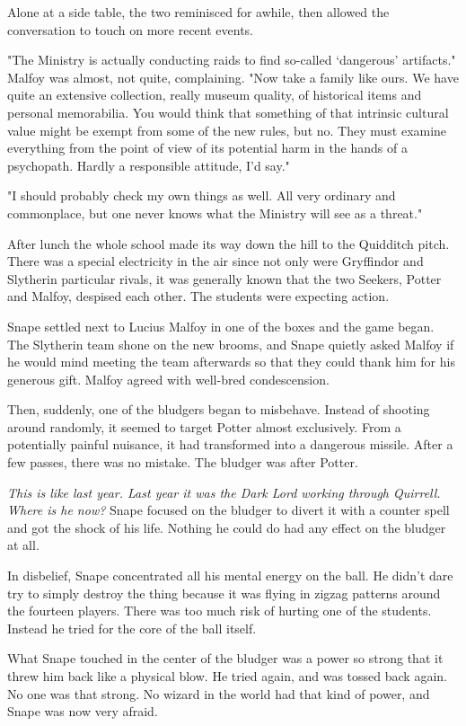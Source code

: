 \documentclass[a4paper,11pt]{article}
\begin{document}
Alone at a side table, the two reminisced for awhile, then allowed the conversation to touch on more recent events.

"The Ministry is actually conducting raids to find so-called `dangerous' artifacts." Malfoy was almost, not quite, complaining. "Now take a family like ours. We have quite an extensive collection, really museum quality, of historical items and personal memorabilia. You would think that something of that intrinsic cultural value might be exempt from some of the new rules, but no. They must examine everything from the point of view of its potential harm in the hands of a psychopath. Hardly a responsible attitude, I'd say."

"I should probably check my own things as well. All very ordinary and commonplace, but one never knows what the Ministry will see as a threat."

After lunch the whole school made its way down the hill to the Quidditch pitch. There was a special electricity in the air since not only were Gryffindor and Slytherin particular rivals, it was generally known that the two Seekers, Potter and Malfoy, despised each other. The students were expecting action.

Snape settled next to Lucius Malfoy in one of the boxes and the game began. The Slytherin team shone on the new brooms, and Snape quietly asked Malfoy if he would mind meeting the team afterwards so that they could thank him for his generous gift. Malfoy agreed with well-bred condescension.

Then, suddenly, one of the bludgers began to misbehave. Instead of shooting around randomly, it seemed to target Potter almost exclusively. From a potentially painful nuisance, it had transformed into a dangerous missile. After a few passes, there was no mistake. The bludger was after Potter.

\emph{This is like last year. Last year it was the Dark Lord working through Quirrell. Where is he now?} Snape focused on the bludger to divert it with a counter spell and got the shock of his life. Nothing he could do had any effect on the bludger at all.

In disbelief, Snape concentrated all his mental energy on the ball. He didn't dare try to simply destroy the thing because it was flying in zigzag patterns around the fourteen players. There was too much risk of hurting one of the students. Instead he tried for the core of the ball itself.

What Snape touched in the center of the bludger was a power so strong that it threw him back like a physical blow. He tried again, and was tossed back again. No one was that strong. No wizard in the world had that kind of power, and Snape was now very afraid.
\end{document}
